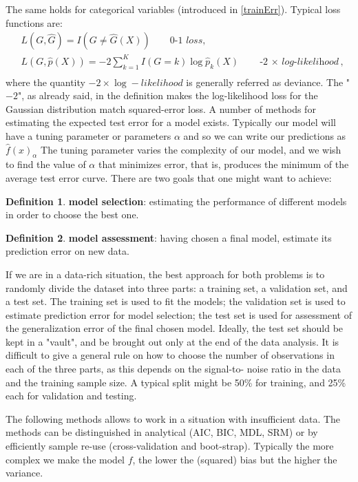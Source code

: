 \documentclass[12pt, letterpaper]{article}
\theoremstyle{definition}
\newtheorem{definition}{Definition}[section]
\begin{document}
The same holds for categorical variables (introduced in \ref{trainErr}). Typical loss functions are:
\begin{equation}
\begin{aligned}
&L(G, \hat{G}) = I(G\ne\hat{G}(X)) \quad\quad \textit{0-1 loss},\\
&L(G, \hat{p}(X)) = -2\sum_{k=1}^K I(G=k)\log\hat{p}_k(X) \quad\quad \textit{-2 $\times$ log-likelihood},\\
\end{aligned}
\end{equation}
where the quantity $-2 \times \log-likelihood$ is generally referred as deviance. The "$-2$", as already said, in the definition makes the log-likelihood loss for the Gaussian distribution match squared-error loss.
A number of methods for estimating the expected test error for a model exists. Typically our model will have a tuning parameter or parameters $\alpha$ and so we can write our predictions as$ \hat{f}(x)_\alpha$
The tuning parameter varies the complexity of our model, and we wish to find the value of $\alpha$ that minimizes error, that is, produces the minimum of the average test error curve. There are two goals that one might want to achieve:
\begin{definition}{\textbf{model selection}}: estimating the performance of different models in order to choose the best one.
\end{definition}
\begin{definition}{\textbf{model assessment}}: having chosen a final model, estimate its prediction error on new data.
\end{definition}


If we are in a data-rich situation, the best approach for both problems is to randomly divide the dataset into three parts: a training set, a validation set, and a test set. The training set is used to fit the models; the validation set is used to estimate prediction error for model selection; the test set is used for assessment of the generalization error of the final chosen model. Ideally, the test set should be kept in a "vault", and be brought out only at the end of the data analysis. It is difficult to give a general rule on how to choose the number of observations in each of the three parts, as this depends on the signal-to- noise ratio in the data and the training sample size. A typical split might be 50\% for training, and 25\% each for validation and testing.

The following methods allows to work in a situation with insufficient data. The methods can be distinguished in analytical (AIC, BIC, MDL, SRM) or by efficiently sample re-use (cross-validation and boot-strap). 
Typically the more complex we make the model $f$, the lower the (squared) bias but the higher the variance.
\end{document}
